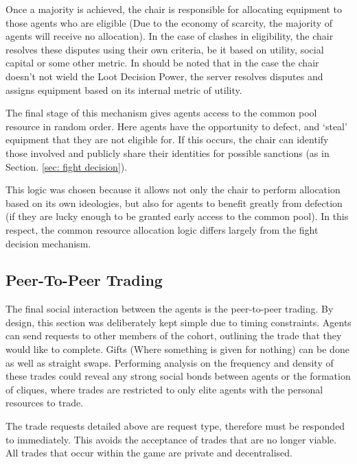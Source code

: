 Once a majority is achieved, the chair is responsible for allocating equipment to those agents who are eligible (Due to the economy of scarcity, the majority of agents will receive no allocation). In the case of clashes in eligibility, the chair resolves these disputes using their own criteria, be it based on utility, social capital or some other metric. In should be noted that in the case the chair doesn't not wield the Loot Decision Power, the server resolves disputes and assigns equipment based on its internal metric of utility. 

The final stage of this mechanism gives agents access to the common pool resource in random order. Here agents have the opportunity to defect, and `steal' equipment that they are not eligible for. If this occurs, the chair can identify those involved and publicly share their identities for possible sanctions (as in Section. \ref{sec: fight decision}). 

This logic was chosen because it allows not only the chair to perform allocation based on its own ideologies, but also for agents to benefit greatly from defection (if they are lucky enough to be granted early access to the common pool). In this respect, the common resource allocation logic differs largely from the fight decision mechanism. 

\subsection{Peer-To-Peer Trading}\label{sec: trading}


The final social interaction between the agents is the peer-to-peer trading. By design, this section was deliberately kept simple due to timing constraints. Agents can send requests to other members of the cohort, outlining the trade that they would like to complete. Gifts (Where something is given for nothing) can be done as well as straight swaps. Performing analysis on the frequency and density of these trades could reveal any strong social bonds between agents or the formation of cliques, where trades are restricted to only elite agents with the personal resources to trade. 

The trade requests detailed above are request type, therefore must be responded to immediately. This avoids the acceptance of trades that are no longer viable. All trades that occur within the game are private and decentralised. 


